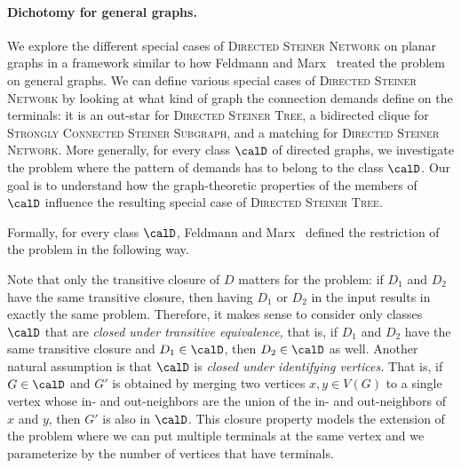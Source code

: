 \paragraph{Dichotomy for general graphs.}
We explore the different special cases of \textsc{Directed Steiner Network} on planar graphs in a framework similar to how Feldmann and Marx~\cite{FeldmannM16} treated the problem on general graphs. We can define various special cases of \textsc{Directed Steiner Network} by looking at what kind of graph the connection demands define on the terminals: it is an out-star for \textsc{Directed Steiner Tree}, a bidirected clique for \textsc{Strongly Connected Steiner Subgraph}, and a matching for \textsc{Directed Steiner Network}. More generally, for every class $\calD$ of directed graphs, we investigate the problem where the pattern of demands has to belong to the class $\calD$. Our goal is to understand how the graph-theoretic properties of the members of $\calD$ influence the resulting special case of \textsc{Directed Steiner Tree}.

Formally, for every class $\calD$, Feldmann and Marx~\cite{FeldmannM16} defined the restriction of the problem in the following way.
\medskip

\medskip

Note that only the transitive closure of $D$ matters for the problem: if $D_1$ and $D_2$ have the same transitive closure, then having $D_1$ or $D_2$ in the input results in exactly the same problem. Therefore, it makes sense to consider only classes $\calD$ that are \emph{closed under transitive equivalence,} that is, if $D_1$ and $D_2$ have the same transitive closure and $D_1\in\calD$, then $D_2\in \calD$ as well. Another natural assumption is that $\calD$ is {\em closed under identifying vertices.} That is, if $G\in \calD$ and $G'$ is obtained by merging two vertices $x,y\in V(G)$ to a single vertex whose in- and out-neighbors are the union of the in- and out-neighbors of $x$ and $y$, then $G'$ is also in $\calD$. This closure property models the extension of the problem where we can put multiple terminals at the same vertex and we parameterize by the number of vertices that have terminals.

